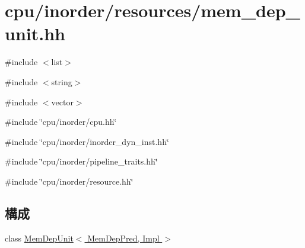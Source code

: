 \hypertarget{inorder_2resources_2mem__dep__unit_8hh}{
\section{cpu/inorder/resources/mem\_\-dep\_\-unit.hh}
\label{inorder_2resources_2mem__dep__unit_8hh}
}
{\ttfamily \#include $<$list$>$}\par
{\ttfamily \#include $<$string$>$}\par
{\ttfamily \#include $<$vector$>$}\par
{\ttfamily \#include \char`\"{}cpu/inorder/cpu.hh\char`\"{}}\par
{\ttfamily \#include \char`\"{}cpu/inorder/inorder\_\-dyn\_\-inst.hh\char`\"{}}\par
{\ttfamily \#include \char`\"{}cpu/inorder/pipeline\_\-traits.hh\char`\"{}}\par
{\ttfamily \#include \char`\"{}cpu/inorder/resource.hh\char`\"{}}\par
\subsection*{構成}
\begin{DoxyCompactItemize}
\item 
class \hyperlink{classMemDepUnit}{MemDepUnit$<$ MemDepPred, Impl $>$}
\end{DoxyCompactItemize}
